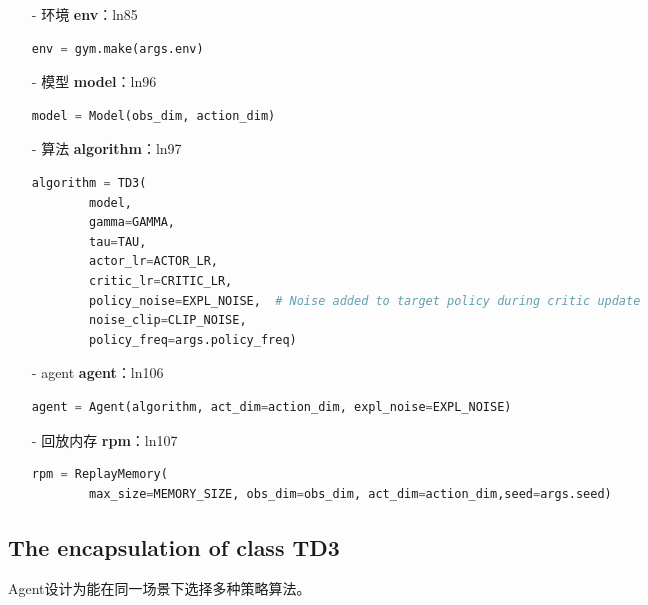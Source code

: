 \begin{itemize}
\item[-]
环境 {\bf env}：ln85
\begin{lstlisting}[language=Python]
    env = gym.make(args.env)
\end{lstlisting}

\item[-]
模型 {\bf model}：ln96
\begin{lstlisting}[language=Python]
    model = Model(obs_dim, action_dim)
\end{lstlisting}

\item[-]
算法 {\bf algorithm}：ln97
\begin{lstlisting}[language=Python]
    algorithm = TD3(
        model,
        gamma=GAMMA,
        tau=TAU,
        actor_lr=ACTOR_LR,
        critic_lr=CRITIC_LR,
        policy_noise=EXPL_NOISE,  # Noise added to target policy during critic update
        noise_clip=CLIP_NOISE,
        policy_freq=args.policy_freq)
\end{lstlisting}

\item[-]
agent {\bf agent}：ln106
\begin{lstlisting}[language=Python]
    agent = Agent(algorithm, act_dim=action_dim, expl_noise=EXPL_NOISE)
\end{lstlisting}

\item[-]
回放内存 {\bf rpm}：ln107
\begin{lstlisting}[language=Python]
    rpm = ReplayMemory(
        max_size=MEMORY_SIZE, obs_dim=obs_dim, act_dim=action_dim,seed=args.seed)
\end{lstlisting}

\end{itemize}


\subsection{The encapsulation of class TD3}

Agent设计为能在同一场景下选择多种策略算法。



